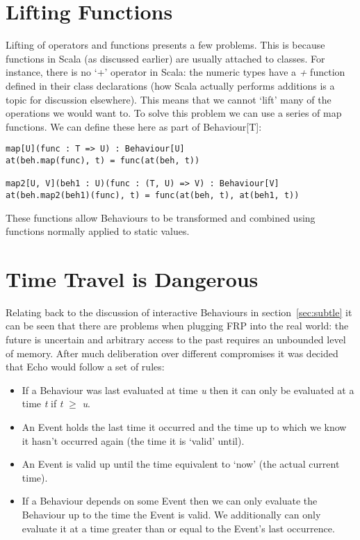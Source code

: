     \section{Lifting Functions}
    Lifting of operators and
    functions presents a few problems. This is because functions in Scala (as discussed earlier)
    are usually attached to classes. For instance, there is no `+' operator in Scala: the numeric
    types have a \emph{+} function defined in their class declarations (how Scala actually performs additions
    is a topic for discussion elsewhere). This means that we cannot `lift' many of the operations we
    would want to. To solve this problem we can use a series of map functions. We can define these
    here as part of Behaviour[T]:

\begin{verbatim}
map[U](func : T => U) : Behaviour[U]
at(beh.map(func), t) = func(at(beh, t))

map2[U, V](beh1 : U)(func : (T, U) => V) : Behaviour[V]
at(beh.map2(beh1)(func), t) = func(at(beh, t), at(beh1, t))
\end{verbatim}        

    These functions allow Behaviours to be transformed and combined using functions
    normally applied to static values.

  \section{Time Travel is Dangerous}
    \label{sec:time}
    Relating back to the discussion of interactive Behaviours in section~\ref{sec:subtle} it can be seen
    that there are problems when plugging FRP into the real world: the future is uncertain and
    arbitrary access to the past requires an unbounded level of memory. After much deliberation
    over different compromises it was decided that Echo would follow a set of rules:
    
    \begin{itemize}
      \item If a Behaviour was last evaluated at time \emph{u} then it can only be evaluated at
      a time \emph{t} if \emph{t} $\geq$ \emph{u}.
      \item An Event holds the last time it occurred and the time up to which we know it hasn't occurred
      again (the time it is `valid' until).
      \item An Event is valid up until the time equivalent to `now' (the actual current time).
      \item If a Behaviour depends on some Event then we can only evaluate the Behaviour up to
      the time the Event is valid. We additionally can only evaluate it at a time greater than
      or equal to the Event's last occurrence.
    \end{itemize}
    
